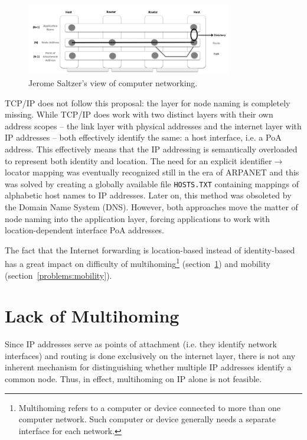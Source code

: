         \begin{figure}[H]
            \begin{center}
                \includegraphics[width=0.8\textwidth]{fig/problems_saltzer.png}
              \caption{Jerome Saltzer's view of computer networking.}
              \label{fig:saltzer}
            \end{center}
        \end{figure}

        TCP/IP does not follow this proposal: the layer for node naming is completely missing. While TCP/IP does work with two distinct layers with their own address scopes -- the link layer with physical addresses and the internet layer with IP addresses -- both effectively identify the same: a host interface, i.e. a PoA address. This effectively means that the IP addressing is semantically overloaded to represent both identity and location. The need for an explicit identifier$\rightarrow$locator mapping was eventually recognized still in the era of ARPANET and this was solved by creating a globally available file \texttt{HOSTS.TXT} containing mappings of alphabetic host names to IP addresses. Later on, this method was obsoleted by the Domain Name System (DNS). However, both approaches move the matter of node naming into the application layer, forcing applications to work with location-dependent interface PoA addresses.

        The fact that the Internet forwarding is location-based instead of identity-based has a great impact on difficulty of multihoming\footnote{Multihoming refers to a computer or device connected to more than one computer network. Such computer or device generally needs a separate interface for each network.} (section~\ref{problems:multihoming}) and mobility (section~\ref{problems:mobility}).

    \section{Lack of Multihoming}\label{problems:multihoming}

        Since IP addresses serve as points of attachment (i.e. they identify network interfaces) and routing is done exclusively on the internet layer, there is not any inherent mechanism for distinguishing whether multiple IP addresses identify a common node. Thus, in effect, multihoming on IP alone is not feasible.

